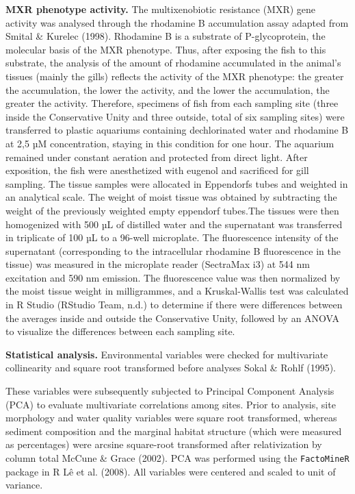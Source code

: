 \documentclass[
  american,
  letterpaper,
  DIV=11,
  numbers=noendperiod]{scrartcl}
\begin{document}
\textbf{MXR phenotype activity.} The multixenobiotic resistance (MXR)
gene activity was analysed through the rhodamine B accumulation assay
adapted from Smital \& Kurelec (1998). Rhodamine B is a substrate of
P-glycoprotein, the molecular basis of the MXR phenotype. Thus, after
exposing the fish to this substrate, the analysis of the amount of
rhodamine accumulated in the animal's tissues (mainly the gills)
reflects the activity of the MXR phenotype: the greater the
accumulation, the lower the activity, and the lower the accumulation,
the greater the activity. Therefore, specimens of fish from each
sampling site (three inside the Conservative Unity and three outside,
total of six sampling sites) were transferred to plastic aquariums
containing dechlorinated water and rhodamine B at 2,5 µM concentration,
staying in this condition for one hour. The aquarium remained under
constant aeration and protected from direct light. After exposition, the
fish were anesthetized with eugenol and sacrificed for gill sampling.
The tissue samples were allocated in Eppendorfs tubes and weighted in an
analytical scale. The weight of moist tissue was obtained by subtracting
the weight of the previously weighted empty eppendorf tubes.The tissues
were then homogenized with 500 µL of distilled water and the supernatant
was transferred in triplicate of 100 µL to a 96-well microplate. The
fluorescence intensity of the supernatant (corresponding to the
intracellular rhodamine B fluorescence in the tissue) was measured in
the microplate reader (SectraMax i3) at 544 nm excitation and 590 nm
emission. The fluorescence value was then normalized by the moist tissue
weight in milligrammes, and a Kruskal-Wallis test was calculated in R
Studio (RStudio Team, n.d.) to determine if there were differences
between the averages inside and outside the Conservative Unity, followed
by an ANOVA to visualize the differences between each sampling site.

\textbf{Statistical analysis.} Environmental variables were checked for
multivariate collinearity and square root transformed before analyses
Sokal \& Rohlf (1995).

These variables were subsequently subjected to Principal Component
Analysis (PCA) to evaluate multivariate correlations among sites. Prior
to analysis, site morphology and water quality variables were square
root transformed, whereas sediment composition and the marginal habitat
structure (which were measured as percentages) were arcsine square-root
transformed after relativization by column total McCune \& Grace (2002).
PCA was performed using the \texttt{FactoMineR} package in R Lê et al.
(2008). All variables were centered and scaled to unit of variance.
\end{document}
